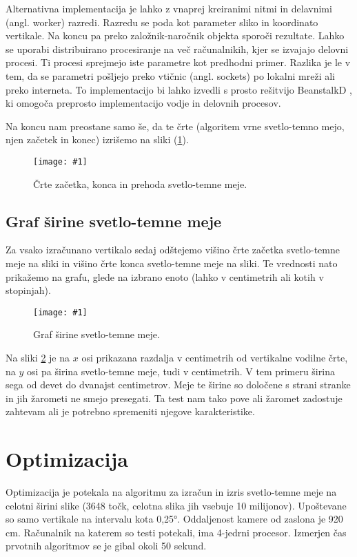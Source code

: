 \documentclass[oneside, a4paper, 12pt]{book}
\newcommand{\slika}[3]{
	\begin{figure}
	\begin{center}
	\texttt{[image: \#1]}
	\end{center}
	\vspace{-20pt}
	\caption{#2}
	\label{#3}
	\end{figure}
}
\begin{document}
Alternativna implementacija je lahko z vnaprej kreiranimi nitmi in delavnimi (angl. worker) razredi. Razredu se poda kot parameter sliko in koordinato vertikale. Na koncu pa preko založnik-naročnik objekta sporoči rezultate. Lahko se uporabi distribuirano procesiranje na več računalnikih, kjer se izvajajo delovni procesi. Ti procesi sprejmejo iste parametre kot predhodni primer. Razlika je le v tem, da se parametri pošljejo preko vtičnic (angl. sockets) po lokalni mreži ali preko interneta. To implementacijo bi lahko izvedli s prosto rešitvijo BeanstalkD \cite{beanstalkd}, ki omogoča preprosto implementacijo vodje in delovnih procesov.

Na koncu nam preostane samo še, da te črte (algoritem vrne svetlo-temno mejo, njen začetek in konec) izrišemo na sliki (\ref{pic:svet-tem3}). 



\slika{slike/svetlo-temna-meja-po-celi-sirini.jpg}{Črte začetka, konca in prehoda svetlo-temne meje.}{pic:svet-tem3}

\subsection{Graf širine svetlo-temne meje}
Za vsako izračunano vertikalo sedaj odštejemo višino črte začetka svetlo-temne meje na sliki in višino črte konca svetlo-temne meje na sliki. Te vrednosti nato prikažemo na grafu, glede na izbrano enoto (lahko v centimetrih ali kotih v stopinjah).

\slika{slike/graf-sirina-s-t-meja-crop.jpg}{Graf širine svetlo-temne meje.}{pic:st-sirina}


Na sliki \ref{pic:st-sirina} je na $x$ osi prikazana razdalja v centimetrih od vertikalne vodilne črte, na $y$ osi pa širina svetlo-temne meje, tudi v centimetrih. V tem primeru širina sega od devet do dvanajst centimetrov. Meje te širine so določene s strani stranke in jih žarometi ne smejo presegati. Ta test nam tako pove ali žaromet zadostuje zahtevam ali je potrebno spremeniti njegove karakteristike.


\section{Optimizacija}
Optimizacija je potekala na algoritmu za izračun in izris svetlo-temne meje na celotni širini slike (3648 točk, celotna slika jih vsebuje 10 milijonov). Upoštevane so samo vertikale na intervalu kota 0,25°. Oddaljenost kamere od zaslona je 920 cm. Računalnik na katerem so testi potekali, ima 4-jedrni procesor. Izmerjen čas prvotnih algoritmov se je gibal okoli 50 sekund.
\end{document}
